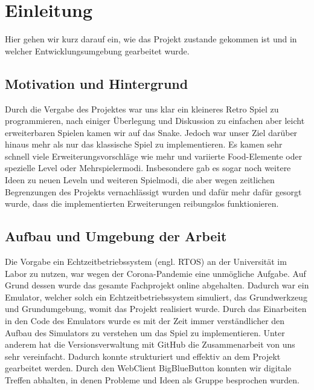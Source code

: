 
\chapter{Einleitung}
\label{Einleitung}

Hier gehen wir kurz darauf ein, wie das Projekt zustande gekommen ist und in welcher Entwicklungsumgebung gearbeitet wurde.

\section{Motivation und Hintergrund}
\label{Motivation_und_Hintergrund}
%
Durch die Vergabe des Projektes war uns klar ein kleineres Retro Spiel zu programmieren, nach einiger Überlegung und Diskussion zu einfachen aber leicht erweiterbaren Spielen kamen wir auf das Snake. Jedoch war unser Ziel dar{\"u}ber hinaus mehr als nur das klassische Spiel zu implementieren. Es kamen sehr schnell viele Erweiterungsvorschl{\"a}ge wie mehr und variierte Food-Elemente oder spezielle Level oder Mehrspielermodi. Insbesondere gab es sogar noch weitere Ideen zu neuen Leveln und weiteren Spielmodi, die aber wegen zeitlichen Begrenzungen des Projekts vernachl{\"a}ssigt wurden und daf{\"u}r mehr dafür gesorgt wurde, dass die implementierten Erweiterungen reibungslos funktionieren.


\section{Aufbau und Umgebung der Arbeit}
\label{Aufbau_und_Umgebung_der_Arbeit}
%
Die Vorgabe ein Echtzeitbetriebssystem (engl. RTOS) an der Universit{\"a}t im Labor zu nutzen, war wegen der Corona-Pandemie eine unm{\"o}gliche Aufgabe. Auf Grund dessen wurde das gesamte Fachprojekt online abgehalten. Dadurch war ein Emulator, welcher solch ein Echtzeitbetriebssystem simuliert, das Grundwerkzeug und Grundumgebung, womit das Projekt realisiert wurde. Durch das Einarbeiten in den Code des Emulators wurde es mit der Zeit immer verst{\"a}ndlicher den Aufbau des Simulators zu verstehen um das Spiel zu implementieren. Unter anderem hat die Versionsverwaltung mit GitHub die Zusammenarbeit von uns sehr vereinfacht. Dadurch konnte strukturiert und effektiv an dem Projekt gearbeitet werden. Durch den WebClient BigBlueButton konnten wir digitale Treffen abhalten, in denen Probleme und Ideen als Gruppe besprochen wurden. 